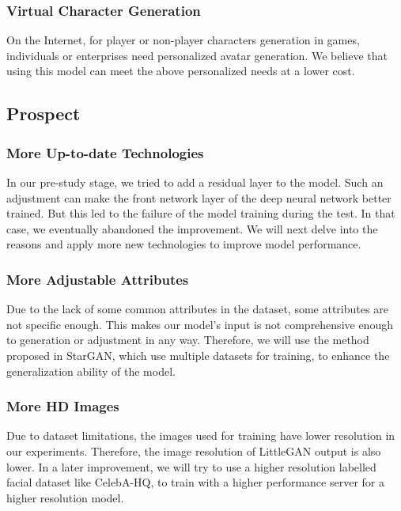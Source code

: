 \subsubsection*{Virtual Character Generation}
On the Internet, for player or non-player characters generation in games,
    individuals or enterprises need personalized avatar generation.
We believe that using this model can meet the above personalized needs at a lower cost.

\subsection{Prospect}

\subsubsection*{More Up-to-date Technologies}

In our pre-study stage, we tried to add a residual layer to the model.
Such an adjustment can make the front network layer of the deep neural network better trained.
But this led to the failure of the model training during the test.
In that case, we eventually abandoned the improvement.
We will next delve into the reasons and apply more new technologies to improve model performance.


\subsubsection*{More Adjustable Attributes}

Due to the lack of some common attributes in the dataset,
    some attributes are not specific enough.
This makes our model's input is not comprehensive enough to generation or adjustment in any way.
Therefore, we will use the method proposed in StarGAN,
    which use multiple datasets for training, to enhance the generalization ability of the model.


\subsubsection*{More HD Images}

Due to dataset limitations, the images used for training have lower resolution in our experiments.
Therefore, the image resolution of LittleGAN output is also lower.
In a later improvement, we will try to use a higher resolution labelled facial dataset like CelebA-HQ,
    to train with a higher performance server for a higher resolution model.


